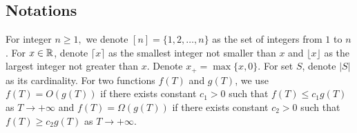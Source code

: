 \subsection{Notations}
For integer $n\ge 1,$ we denote $[n]=\{1,2,\dots,n\}$ as the set of integers from $1$ to $n$. For $x\in\mathbb{R}$, denote $\lceil x\rceil$ as the smallest integer not smaller than $x$ and $\lfloor x\rfloor$ as the largest integer not greater than $x$. Denote $x_+=\max\{x, 0\}$. For set $S$, denote $|S|$ as its cardinality. For two functions $f(T)$ and $g(T)$, we use $f(T)=O(g(T))$ if there exists constant $c_1>0$ such that $f(T)\le c_1g(T)$ as $T\to+\infty$ and $f(T)=\Omega(g(T))$ if there exists constant $c_2>0$ such that $f(T)\ge c_2g(T)$ as $T\to +\infty$. 